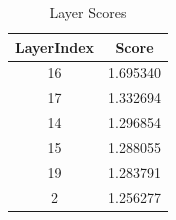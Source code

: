 
\begin{table}[h]
\centering
\begin{tabular}{|c|c|}
\hline
LayerIndex & Score \\
\hline
16 & 1.695340 \\
\hline
17 & 1.332694 \\
\hline
14 & 1.296854 \\
\hline
15 & 1.288055 \\
\hline
19 & 1.283791 \\
\hline
2 & 1.256277 \\
\hline
\end{tabular}
\caption{Layer Scores}
\end{table}
